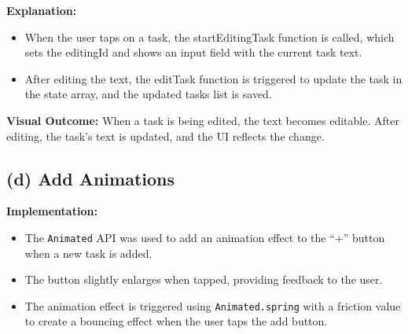 \documentclass[12pt]{article}
\begin{document}
\textbf{Explanation:}  
\begin{itemize}[left=1.5em]
    \item When the user taps on a task, the startEditingTask function is called, which sets the editingId and shows an input field with the current task text.
    \item After editing the text, the editTask function is triggered to update the task in the state array, and the updated tasks list is saved.
\end{itemize}
\textbf{Visual Outcome:}  
When a task is being edited, the text becomes editable. After editing, the task's text is updated, and the UI reflects the change.

\subsection*{(d) Add Animations}
\textbf{Implementation:}  
\begin{itemize}[left=1.5em]
    \item The \texttt{Animated} API was used to add an animation effect to the “+” button when a new task is added.
    \item The button slightly enlarges when tapped, providing feedback to the user.
    \item The animation effect is triggered using \texttt{Animated.spring} with a friction value to create a bouncing effect when the user taps the add button.
\end{itemize}
\end{document}
